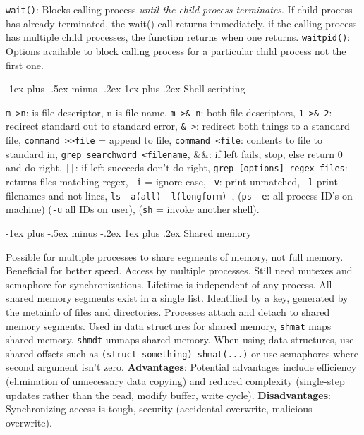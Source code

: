 \documentclass[10pt,landscape, a4paper]{article}
\makeatletter
\renewcommand{\subsection}{\@startsection{section}{1}{0mm}%
                                {-1ex plus -.5ex minus -.2ex}%
                                {0.5ex plus .2ex}%
                                {\normalfont\large\bfseries}}
\renewcommand{\subsection}{\@startsection{subsection}{2}{0mm}%
                                {-1explus -.5ex minus -.2ex}%
                                {0.5ex plus .2ex}%
                                {\normalfont\normalsize\bfseries}}
\renewcommand{\subsection}{\@startsection{subsubsection}{3}{0mm}%
                                {-1ex plus -.5ex minus -.2ex}%
                                {1ex plus .2ex}%
                                {\normalfont\small\bfseries}}
\makeatother
\begin{document}
\begin{multicols}{3}


\texttt{wait()}: Blocks calling process \emph{until the child process terminates}. 
If child process has already terminated, the wait() call returns immediately. 
if the calling process has multiple child processes, the function returns when one returns.
\texttt{waitpid()}: Options available to block calling process for a particular 
child process not the first one.

\subsection{Shell scripting}

\texttt{m \textgreater n}: is file descriptor, n is file name,
\texttt{m \textgreater \& n}: both file descriptors,
\texttt{1 \textgreater \& 2}: redirect standard out to standard error,
\texttt{\& \textgreater}: redirect both things to a standard file,
\texttt{command \textgreater\textgreater file} = append to file,
\texttt{command \textless file}: contents to file to standard in,
\texttt{grep searchword \textless filename},
\&\&: if left fails, stop, else return 0 and do right,
\texttt{||}: if left succeeds don't do right,
\texttt{grep [options] regex files}: returns files matching regex,
\texttt{-i} = ignore case, \texttt{-v}: print unmatched, \texttt{-l} print filenames and not lines,
\texttt{ls -a(all) -l(longform)	},
(\texttt{ps -e}: all process ID's on machine) (\texttt{-u} all IDs on user),
(\texttt{sh} = invoke another shell).



\subsection{Shared memory}

Possible for multiple processes to share segments of memory, 
not full memory. Beneficial for better speed. Access by multiple processes.
Still need mutexes and semaphore for synchronizations. 
Lifetime is independent of any process. All shared memory segments 
exist in a single list. Identified by a key, generated by the metainfo of 
files and directories. Processes attach and detach to shared memory segments.
Used in data structures for shared memory, \texttt{shmat} maps shared memory.
\texttt{shmdt} unmaps shared memory. When using data structures, use shared offsets such as
\texttt{(struct something) shmat(...)} or use semaphores where second argument isn't
zero. \textbf{Advantages}: Potential advantages include efficiency (elimination of unnecessary data copying) 
and reduced complexity (single-step updates rather than the read, modify buffer, write cycle).
\textbf{Disadvantages}: Synchronizing access is tough, security (accidental overwrite, malicious overwrite).


\end{multicols}
\end{document}
